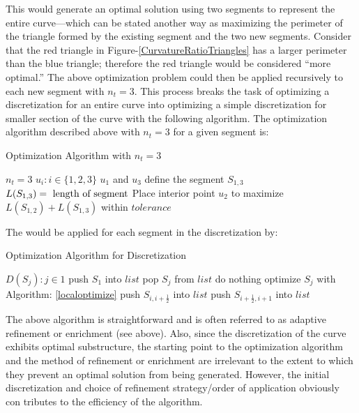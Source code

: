 This would generate an optimal solution using two segments to represent the entire curve—which can be stated another way as maximizing the perimeter of the triangle formed by the existing segment and the two new segments.  Consider that the red triangle in Figure-\ref{CurvatureRatioTriangles} has a larger perimeter than the blue triangle; therefore the red triangle would be considered ``more optimal.'' The above optimization problem could then be applied recursively to each new segment with $n_t=3$.  This process breaks the task of optimizing a discretization for an entire curve into optimizing a simple discretization for smaller section of the curve with the following algorithm.  The optimization algorithm described above with $n_t=3$ for a given segment is:

\begin{algorithm}
\caption{Optimization Algorithm with $n_t=3$}\label{localoptimize}
\begin{algorithmic}[1]
\State $n_t = 3$
\State $u_i : i \in \{1,2,3\}$
\State $u_1 $ and $u_3$ define the segment $S_{1,3}$
  \State $L(S_{1,3}) =\textnormal{ length of segment}$
  \State Place interior point $u_2$ to maximize $L(S_{1,2})+L(S_{1,3})$ within $tolerance$
\EndProcedure
\end{algorithmic}
\end{algorithm}

The would be applied for each segment in the discretization by:

\begin{algorithm}
\caption{Optimization Algorithm for Discretization}
\begin{algorithmic}
  \State $D(S_j) : j \in {1}$
  \State push $S_1$ into $list$ 
    \State pop $S_j$ from $list$
      \State do nothing
    \Else
      \State optimize $S_j$ with Algorithm: \ref{localoptimize}
      \State push $S_{i,i+\frac{1}{2}}$ into $list$
      \State push $S_{i+\frac{1}{2},i+1}$ into $list$
    \EndIf
  \EndWhile
\end{algorithmic}
\end{algorithm}

The above algorithm is straightforward and is often referred to as adaptive refinement or enrichment (see above).  Also, since the discretization of the curve exhibits optimal substructure, the starting point to the optimization algorithm and the method of refinement or enrichment are irrelevant to the extent to which they prevent an optimal solution from being generated.  However, the initial discretization and choice of refinement strategy/order of application obviously con
tributes to the efficiency of the algorithm.

